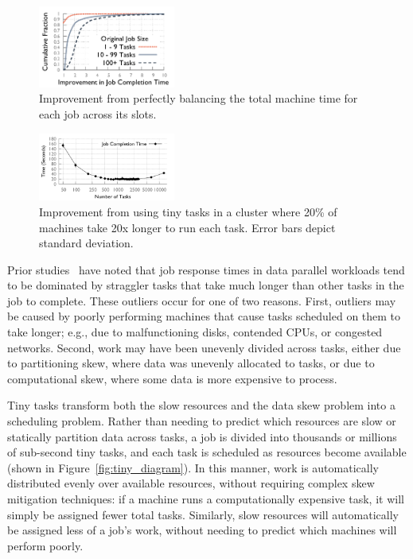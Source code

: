 \begin{figure}[t]
  \centering
    \includegraphics[width=0.4\textwidth]{figures/binpacked1-sep}
    \vspace{-3ex}
    \caption{ Improvement from perfectly balancing the total machine time for
    each job across its slots. }
    \label{fig:binpacked}
\end{figure}

\begin{figure}[t]
    \includegraphics[width=0.4\textwidth]{figures/spark_experiment/straggler}
    \vspace{-3ex}
    \caption{Improvement from using tiny tasks in a cluster where 20\% of machines
take 20x longer to run each task. Error bars depict standard deviation.}
    \label{fig:sparkskew}
\end{figure}
Prior studies~\cite{ananthanarayanan2010reining,zaharia2008improving} have
noted that job response times in data parallel workloads tend to be
dominated by straggler tasks that take much longer than other tasks in the
job to complete.
These outliers occur for one of two reasons.
First, outliers may be caused by poorly performing machines that cause tasks scheduled
on them to take longer; e.g.,
due to malfunctioning disks, contended CPUs, or congested networks.
Second, work may have been unevenly
divided across tasks, either due to
partitioning skew, where data was unevenly allocated to tasks, or due to
computational skew, where some data is more expensive to process.

Tiny tasks transform both the slow resources and the data skew problem
into a scheduling problem.  Rather than needing to predict which resources
are slow or statically partition data across tasks, a job is divided into
thousands or millions of sub-second tiny tasks, and each task is scheduled
as resources become available (shown in Figure~\ref{fig:tiny_diagram}).  In this manner, work is automatically
distributed evenly over available resources, without requiring complex skew
mitigation techniques: if a machine runs a computationally expensive task, it
will simply be assigned fewer total tasks.  Similarly, slow resources will
automatically be assigned less of a job's work, without needing to predict which
machines will perform poorly.

